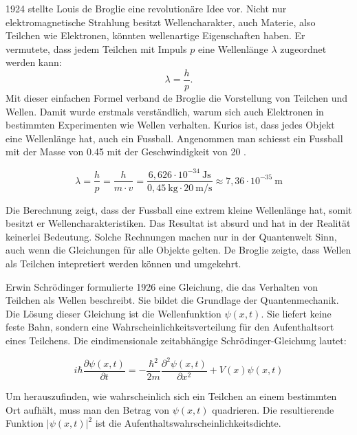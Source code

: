 	
	
	1924 stellte Louis de Broglie eine revolutionäre Idee vor.
	Nicht nur elektromagnetische Strahlung besitzt Wellencharakter, auch Materie, also Teilchen wie Elektronen, könnten wellenartige Eigenschaften haben.
	Er vermutete, dass jedem Teilchen mit Impuls $p$ eine Wellenlänge $\lambda$ zugeordnet werden kann:
	\begin{equation}
		\lambda = \frac{h}{p}.
	\end{equation}	
	Mit dieser einfachen Formel verband de Broglie die Vorstellung von Teilchen und Wellen. Damit wurde erstmals verständlich, warum sich auch Elektronen in bestimmten Experimenten wie Wellen verhalten.
	Kurios ist, dass jedes Objekt eine Wellenlänge hat, auch ein Fussball.
	Angenommen man schiesst ein Fussball mit der Masse von 0.45  mit der Geschwindigkeit von 20 .
	
	\begin{equation}
		\lambda = \frac{h}{p} = \frac{h}{m \cdot v} = 	\frac{6{,}626 \cdot 10^{-34} \ \text{Js}}{0{,}45 \ \text{kg} \cdot 20 \ \text{m/s}} \approx 7{,}36 \cdot 10^{-35} \ \text{m}
	\end{equation}	
	
	Die Berechnung zeigt, dass der Fussball eine extrem kleine Wellenlänge hat, somit besitzt er Wellencharakteristiken.
	Das Resultat ist absurd und hat in der Realität keinerlei Bedeutung.
	Solche Rechnungen machen nur in der Quantenwelt Sinn, auch wenn die Gleichungen für alle Objekte gelten. 
	De Broglie zeigte, dass Wellen als Teilchen intepretiert werden können und umgekehrt. 
	
	
	
	Erwin Schrödinger formulierte 1926 eine Gleichung, die das Verhalten von Teilchen als Wellen beschreibt. 
	Sie bildet die Grundlage der Quantenmechanik. Die Lösung dieser Gleichung ist die Wellenfunktion $\psi(x, t)$. Sie liefert keine feste Bahn, sondern eine Wahrscheinlichkeitsverteilung für den Aufenthaltsort eines Teilchens.
	Die eindimensionale zeitabhängige Schrödinger-Gleichung lautet:
	
	\begin{equation}\label{fourier:equation:zeitabhaengigeSchroedingerGleichung}
		i \hbar \frac{\partial \psi(x,t)}{\partial t} = -\frac{\hbar^2}{2m} \frac{\partial^2 \psi(x,t)}{\partial x^2} + V(x) \psi(x,t)
	\end{equation}
	
	
	Um herauszufinden, wie wahrscheinlich sich ein Teilchen an einem bestimmten Ort aufhält, muss man den Betrag von $\psi(x, t)$ quadrieren. 
	Die resultierende Funktion $|\psi(x, t)|^2$ ist die Aufenthaltswahrscheinlichkeitsdichte. 
	
